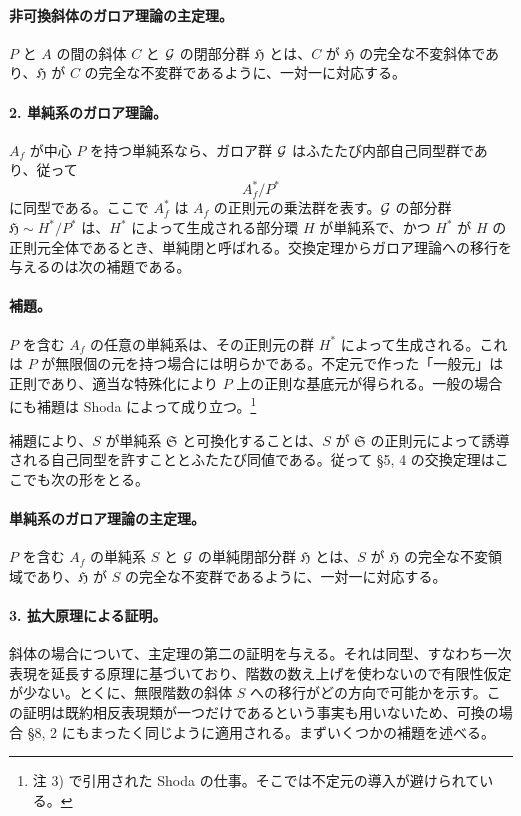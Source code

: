 \paragraph{非可換斜体のガロア理論の主定理。}
\(P\) と \(A\) の間の斜体 \(C\) と \(\mathcal G\) の閉部分群 \(\mathfrak H\) とは、\(C\) が \(\mathfrak H\) の完全な不変斜体であり、\(\mathfrak H\) が \(C\) の完全な不変群であるように、一対一に対応する。

\paragraph{2. 単純系のガロア理論。}
\(A_f\) が中心 \(P\) を持つ単純系なら、ガロア群 \(\mathcal G\) はふたたび内部自己同型群であり、従って
\[
        A_f^*/P^*
\]
に同型である。ここで \(A_f^*\) は \(A_f\) の正則元の乗法群を表す。\(\mathcal G\) の部分群 \(\mathfrak H\sim H^*/P^*\) は、\(H^*\) によって生成される部分環 \(H\) が単純系で、かつ \(H^*\) が \(H\) の正則元全体であるとき、単純閉と呼ばれる。交換定理からガロア理論への移行を与えるのは次の補題である。

\paragraph{補題。}
\(P\) を含む \(A_f\) の任意の単純系は、その正則元の群 \(H^*\) によって生成される。これは \(P\) が無限個の元を持つ場合には明らかである。不定元で作った「一般元」は正則であり、適当な特殊化により \(P\) 上の正則な基底元が得られる。一般の場合にも補題は Shoda によって成り立つ。\footnote{注 3) で引用された Shoda の仕事。そこでは不定元の導入が避けられている。}

補題により、\(S\) が単純系 \(\mathfrak S\) と可換化することは、\(S\) が \(\mathfrak S\) の正則元によって誘導される自己同型を許すこととふたたび同値である。従って §5, 4 の交換定理はここでも次の形をとる。

\paragraph{単純系のガロア理論の主定理。}
\(P\) を含む \(A_f\) の単純系 \(S\) と \(\mathcal G\) の単純閉部分群 \(\mathfrak H\) とは、\(S\) が \(\mathfrak H\) の完全な不変領域であり、\(\mathfrak H\) が \(S\) の完全な不変群であるように、一対一に対応する。

\paragraph{3. 拡大原理による証明。}
斜体の場合について、主定理の第二の証明を与える。それは同型、すなわち一次表現を延長する原理に基づいており、階数の数え上げを使わないので有限性仮定が少ない。とくに、無限階数の斜体 \(S\) への移行がどの方向で可能かを示す。この証明は既約相反表現類が一つだけであるという事実も用いないため、可換の場合 §8, 2 にもまったく同じように適用される。まずいくつかの補題を述べる。

